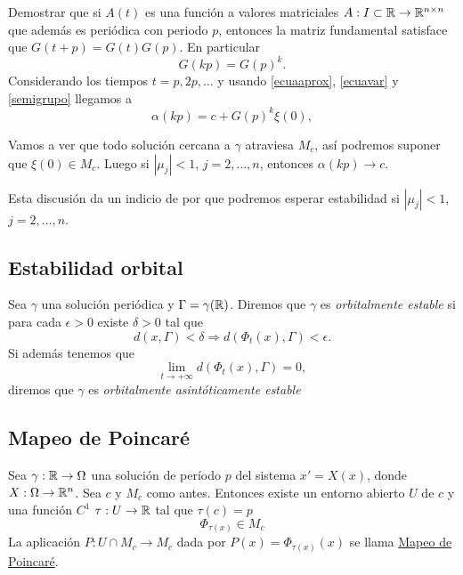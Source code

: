 \begin{ejercicio}{}
 Demostrar que si $A(t)$ es una función a valores matriciales $A:I\subset\mathbb{R}\to\mathbb{R}^{n\times n}$ que además es periódica con periodo $p$,
entonces la matriz fundamental satisface que $G(t+p)=G(t)G(p)$. En particular
\begin{equation}\label{semigrupo}G(kp)=G(p)^k.\end{equation}
Considerando los tiempos $t=p,2p,\ldots$ y usando \eqref{ecuaaprox}, \eqref{ecuavar} y \eqref{semigrupo} llegamos a
\[\alpha(kp)=c+G(p)^k\xi(0),\]
\end{ejercicio}


Vamos a ver que todo solución cercana a $\gamma$ atraviesa $M_c$, así podremos suponer que $\xi(0)\in M_c$. Luego si $|\mu_j|<1$, $j=2,\ldots,n$, 
entonces $\alpha(kp)\to c$. 

Esta discusión da un indicio de por que podremos esperar estabilidad si  $|\mu_j|<1$, $j=2,\ldots,n$.






\subsection{Estabilidad orbital}
\begin{definicion}{}
  Sea $\gamma$ una solución periódica y $\Gamma=\gamma(\mathbb{R})$. Diremos que $\gamma$ es \emph{orbitalmente estable} si para cada $\epsilon>0$ existe $\delta>0$ tal que
 \[d(x,\Gamma)<\delta\Rightarrow d(\Phi_t(x),\Gamma)<\epsilon.\]
 Si además tenemos que
  \[\lim_{t\to +\infty}d(\Phi_t(x),\Gamma)=0,\]
  diremos que $\gamma$ es \emph{orbitalmente asintóticamente estable}
\end{definicion}




\subsection{Mapeo de Poincaré}


\begin{teorema}{}
 Sea $\gamma:\mathbb{R}\to\Omega$ una solución de período $p$ del sistema $x'=X(x)$, donde $X:\Omega\to \mathbb{R}^n$. Sea $c$ y $M_c$ como antes. Entonces existe un entorno abierto $U$ de $c$ 
 y una función $C^1$ $\tau:U\to \mathbb{R}$ tal que $\tau(c)=p$
 \[\Phi_{\tau(x)}\in M_c\]
La aplicación $P:U\cap M_c\to M_c$ dada por $P(x)=\Phi_{\tau(x)}(x)$ se llama \href{http://es.wikipedia.org/wiki/Aplicación_de_Poincaré}{Mapeo de Poincaré}.
\end{teorema}

